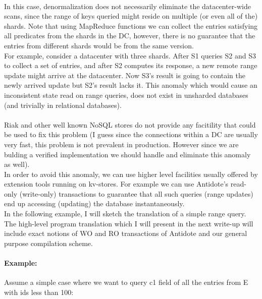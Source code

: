 \documentclass[12pt]{article}
\begin{document}
\paragraph{} In this case, denormalization does not necessarily eliminate the datacenter-wide scans, 
since the range of keys queried might reside on multiple 
(or even all of the) shards. Note that using MapReduce functions we can collect the entries satisfying all predicates from the shards in the DC, however, there is no guarantee that the entries 
from different shards would be from the same version. 
\\ For example, 
consider a datacenter with three shards. After S1 queries S2 and S3 to collect 
a set of entries, and after S2 computes its response, a new remote range update might arrive at the datacenter. 
Now S3's result is going to contain the newly arrived update but S2's result
lacks it. This anomaly which would cause an inconsistent state read on range
queries, does not exist in unsharded databases (and trivially in relational databases). 
\paragraph{} Riak and other well known NoSQL stores do not provide any
facitility that could be used to fix this problem (I guess since the connections within a DC are usually very fast, 
this problem is not prevalent in production. However since we are bulding a
verified implementation we should handle and eliminate this anomaly as well).
\\ In order to avoid this anomaly, we can use higher level facilities usually
offered by extension
tools running on kv-stores. For example we can use Antidote's read-only (write-only) transactions
to guarantee that all such queries (range updates) end up accessing
(updating) the database instantaneously. \\
In the following example, I will sketch the translation of a simple range query.
The high-level program translation which I will present in the next write-up
will include exact notions of WO and RO transactions of Antidote and our general
purpose compilation scheme.


\paragraph{Example:} Assume a simple case where we want to query c1 field of all the entries from E
with ids less than 100:
\end{document}
